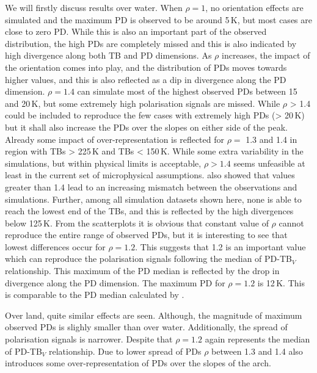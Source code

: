 \documentclass[amt, manuscript]{copernicus}
\begin{document}
We will firstly discuss results over water. When $\rho = 1$, no orientation effects are simulated and the maximum PD is observed to be around 5\,K, but most cases are close to zero PD. While this is also an important part of the observed distribution, the high PDs are completely missed and this is also indicated by high divergence along both TB and PD dimensions. As $\rho$ increases, the impact of the orientation comes into play, and the distribution of PDs moves towards higher values, and this is also reflected as a dip in divergence along the PD dimension.  $\rho = 1.4$ can simulate most of the highest observed PDs between 15 and 20\,K, but some extremely high polarisation signals are missed. While $\rho$ > 1.4  could be included to reproduce the few cases with extremely high PDs (> 20\,K) but it shall also increase the PDs over the slopes on either side of the peak. Already some impact of over-representation is reflected for $\rho =$ 1.3 and 1.4 in region with TBs > 225\,K and TBs < 150\,K. While some extra variability in the simulations, but within physical limits is acceptable, $\rho > 1.4$ seems unfeasible at least in the current set of microphysical assumptions. \citet{barlakas:intro:21} also showed that values greater than 1.4 lead to an increasing mismatch between the observations and simulations. Further, among all simulation datasets shown here, none is able to reach the lowest end of the TBs, and this is reflected by the high divergences below 125\,K. From the scatterplots it is obvious that constant value of $\rho$ cannot reproduce the entire range of observed PDs, but it is  interesting to see that lowest differences occur for  $\rho = 1.2$. This suggests that 1.2 is an important value which can reproduce the polarisation signals following the median of PD-TB$_V$ relationship. This maximum of the PD median is reflected by the drop in divergence along the PD dimension. The maximum PD for $\rho = 1.2$ is 12\,K. This is comparable to the PD median calculated by \citet{galligani:param:21}. 

Over land, quite similar effects are seen. Although, the magnitude of maximum observed PDs is slighly smaller than over water. Additionally, the spread of polarisation signals is narrower. Despite that $\rho = 1.2$ again represents the median of PD-TB$_{V}$ relationship. Due to lower spread of PDs $\rho$ between 1.3 and 1.4 also introduces some over-representation of PDs over the slopes of the arch. 
\end{document}
